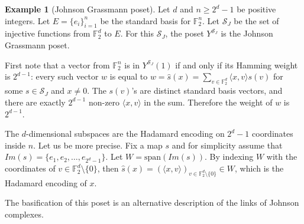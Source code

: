 \documentclass[10pt,a4paper]{article}
\theoremstyle{definition}
\newtheorem{example}[theorem]{Example}
\theoremstyle{remark}
\newcommand{\set}[1]{\{#1\}}
\newcommand{\iprod}[1]{\langle#1\rangle}
\def\sp{\mathrm{ span}}
\newcommand{\F}{\mathbb{F}}
\renewcommand{\geq}{\geqslant}
\numberwithin{equation}{section}
\def\Y{Y}
\begin{document}
\begin{example}[Johnson Grassmann poset]
    Let \(d\) and \(n \geq 2^d-1\) be positive integers. Let \(E = \set{e_i}_{i=1}^n\) be the standard basis for \(\F_2^n\). Let \(\mathcal{S}_J\) be the set of injective functions from \(\F_2^d\) to \(E\). For this \(\mathcal{S}_J\), the poset \(Y^{\mathcal{S}_J}\) is the Johnson Grassmann poset.
    
    First note that a vector from \( \F_2^n\) is in \(\Y^{\mathcal{S}_J}(1)\) if and only if its Hamming weight is \(2^{d-1}\): every such vector \(w\) is equal to \(w = \widehat{s}(x) = \sum_{v \in \F_2^d} \iprod{x,v} s(v)\) for some \(s \in \mathcal{S}_J\) and \(x \ne 0\). The \(s(v)\)'s are distinct standard basis vectors, and there are exactly \(2^{d-1}\) non-zero \(\iprod{x,v}\) in the sum. Therefore the weight of \(w\) is \(2^{d-1}\).

    The \(d\)-dimensional subspaces are the Hadamard encoding on \(2^d-1\) coordinates inside \(n\). Let us be more precise. Fix a map \(s\) and for simplicity assume that \(Im(s) = \set{e_1,e_2,\dots,e_{2^d-1}}\). Let \(W = \sp (Im(s))\). By indexing \(W\) with the coordinates of \(v \in \F_2^{d} \setminus \set{0}\), then \(\widehat{s}(x) = \left ( \iprod{x,v} \right )_{v \in \F_2^{d} \setminus \set{0}} \in W\), which is the Hadamard encoding of \(x\).

    The basification of this poset is an alternative description of the links of Johnson complexes.
\end{example}
\end{document}
